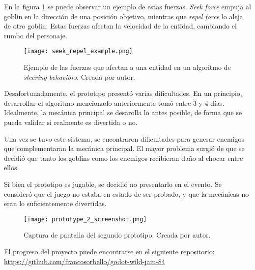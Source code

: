 \par En la figura \ref{fig:x seek repel forces} se puede observar un ejemplo de estas fuerzas. \textit{Seek force} empuja al goblin en la dirección de una posición objetivo, mientras que \textit{repel force} lo aleja de otro goblin. Estas fuerzas afectan la velocidad de la entidad, cambiando el rumbo del personaje.
%
\begin{figure}[H]
  \centering
  \texttt{[image: seek\_repel\_example.png]}
  \caption{Ejemplo de las fuerzas que afectan a una entidad en un algoritmo de \textit{steering behaviors}. Creada por autor.}
  \label{fig:x seek repel forces} 
\end{figure}
%
\bigbreak
\par Desafortunadamente, el prototipo presentó varias dificultades. En un principio, desarrollar el algoritmo mencionado anteriormente tomó entre 3 y 4 días. Idealmente, la mecánica principal se desarolla lo antes posible, de forma que se pueda validar si realmente es divertida o no. 
\par Una vez se tuvo este sistema, se encontraron dificultades para generar enemigos que complementaran la mecánica principal. El mayor problema surgió de que se decidió que tanto los goblins como los enemigos recibieran daño al chocar entre ellos.
\par Si bien el prototipo es jugable, se decidió no presentarlo en el evento. Se consideró que el juego no estaba en estado de ser probado, y que la mecánicas no eran lo suficientemente divertidas.
%
\begin{figure}[H]
  \centering
  \texttt{[image: prototype\_2\_screenshot.png]}
  \caption{Captura de pantalla del segundo prototipo. Creada por autor.}
  \label{fig:x prototipo 2 godot} 
\end{figure}
\par El progreso del proyecto puede encontrarse en el siguiente repositorio: \url{https://github.com/francosorbello/godot-wild-jam-84}
%
